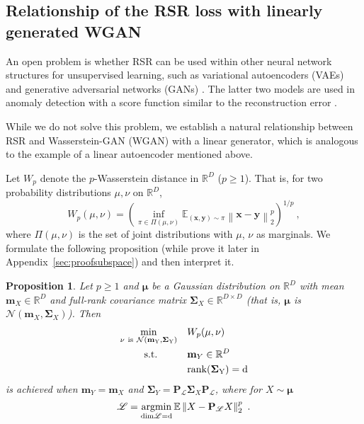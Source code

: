 \documentclass{article} \usepackage{iclr2020_conference,times}
\def\rvm{{\mathbf{m}}}
\def\rvmu{{\mathbf{\mu}}}
\def\rvnu{{\mathbf{\nu}}}
\def\rvx{{\mathbf{x}}}
\def\rvy{{\mathbf{y}}}
\def\rmP{{\mathbf{P}}}
\def\rmSigma{{\mathbf{\Sigma}}}
\newcommand{\E}{\mathbb{E}}
\newcommand{\R}{\mathbb{R}}
\newtheorem{proposition}{Proposition}[section]
\newcommand{\norm}[1]{\left\lVert#1\right\rVert}
\begin{document}
\subsection{Relationship of the RSR loss with linearly generated WGAN}
\label{sec:generative}

An open problem is whether RSR can be used within other neural network structures for unsupervised learning, such as variational autoencoders (VAEs) \citep{kingma2013auto} and generative adversarial networks (GANs) \citep{goodfellow2014generative}. The latter two models are used in anomaly detection with a score function similar to the reconstruction error \citep{an2015variational,vasilev2018q,zenati2018efficient,kliger2018novelty}.


While we do not solve this problem, we establish a natural relationship between RSR and Wasserstein-GAN (WGAN) \citep{arjovsky2017wasserstein, gulrajani2017improved} with a linear generator, which is analogous to the example of a linear autoencoder mentioned above. 

Let $W_p$ denote the $p$-Wasserstein distance in $\R^D$ ($p \geq 1$). That is, for two probability distributions $\mu, \nu$ on $\R^D$,
\begin{equation}\label{eq:defwasserstein}
W_p(\mu, \nu) = \left( \inf_{\pi \in \Pi(\mu, \nu)} \E_{(\rvx,\rvy) \sim \pi} \norm{\rvx-\rvy}_2^p \right)^{1/p} ~,
\end{equation}
where $\Pi(\mu, \nu)$ is the set of joint distributions with $\mu$, $\nu$ as marginals. We formulate the following proposition (while prove it later in Appendix~\ref{sec:proofsubspace}) and then interpret it.


\begin{proposition}\label{prop:subspace}
Let $p\geq 1$ and 
$\rvmu$ be a Gaussian distribution on $\R^D$ with mean $\rvm_X \in \R^D$ and full-rank covariance matrix $\rmSigma_X \in \R^{D \times D}$ (that is, $\rvmu$ is $\mathcal{N} (\rvm_X, \rmSigma_X)$). 
Then \begin{equation}\label{eq:optprob}
\begin{split}
\min_{\rvnu ~\rm{is}~ \mathcal{N}(\rvm_Y, \rmSigma_Y)} \quad & W_p(\rvmu, \rvnu) \\ 
\quad  
\rm{s.t.} \quad \quad \quad &  \rvm_Y \in \R^D \\
\quad & 
\rm{rank} (\rmSigma_Y) = d 
\end{split}
\end{equation}
is achieved when $\rvm_Y=\rvm_X$ and 
$\rmSigma_Y = \rmP_\mathscr{L} \rmSigma_X \rmP_\mathscr{L}$, 
where for $X  \sim \rvmu$
\begin{equation}
\label{eq:rsrganconclusion}
\mathscr{L} = \argminB_{\rm{dim} \mathscr{L} = d} \E \norm{X - \rmP_\mathscr{L} X}_2^p ~.
\end{equation}
\end{proposition}
\end{document}
